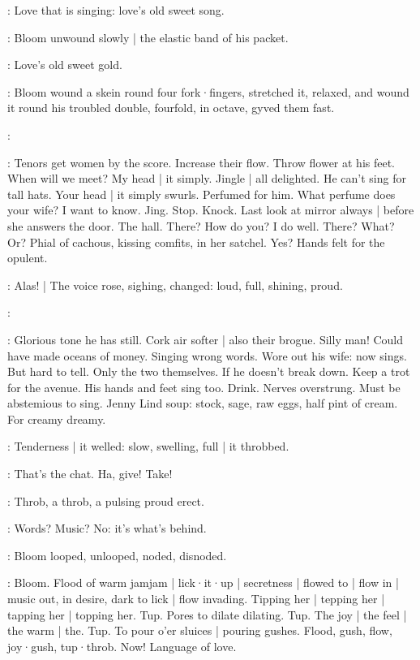 \BloomIntB:
Love that is singing:
love's old sweet song.

:
Bloom unwound slowly |
the elastic band of his packet.

:
Love's old sweet
gold.

:
Bloom wound a skein round four fork·fingers,
stretched it,
relaxed,
and wound it round his troubled double,
fourfold,
in octave,
gyved them fast.

\simon:

\BloomIntB:
Tenors get women by the score.
Increase their flow.
Throw flower at his feet.
When will we meet?
My head |
it simply.
Jingle |
all delighted.
He can't sing for tall hats.
Your head |
it simply swurls.
Perfumed for him.
What perfume does your wife?
I want to know.
Jing.
Stop.
Knock.
Last look at mirror always |
before she answers the door.
The hall.
There?
How do you?
I do well.
There?
What?
Or?
Phial of cachous,
kissing comfits,
in her satchel.
Yes?
Hands felt for the opulent.

:
Alas! |
The voice rose,
sighing,
changed:
loud,
full,
shining,
proud.

\simon:

\BloomIntB:
Glorious tone he has still.
Cork air softer |
also their brogue.
Silly man!
Could have made oceans of money.
Singing wrong words.
Wore out his wife:
now sings.
But hard to tell.
Only the two themselves.
If he doesn't break down.
Keep a trot for the avenue.
His hands and feet sing too.
Drink.
Nerves overstrung.
Must be abstemious to sing.
Jenny Lind soup:
stock,
sage,
raw eggs,
half pint of cream.
For creamy dreamy.

:
Tenderness |
it welled:
slow,
swelling,
full |
it throbbed.

\BloomIntA:
That's the chat.
Ha,
give!
Take!

:
Throb,
a throb,
a pulsing proud erect.

\BloomIntB:
Words?
Music?
No:
it's what's behind.

:
Bloom looped,
unlooped,
noded,
disnoded.

\BloomIntB:
Bloom.
Flood of warm jamjam |
lick·it·up |
secretness |
flowed to |
flow in |
music out,
in desire,
dark to lick |
flow invading.
Tipping her |
tepping her |
tapping her |
topping her.
Tup.
Pores to dilate dilating.
Tup.
The joy |
the feel |
the warm |
the.
Tup.
To pour o'er sluices |
pouring gushes.
Flood,
gush,
flow,
joy·gush,
tup·throb.
Now!
Language of love.

